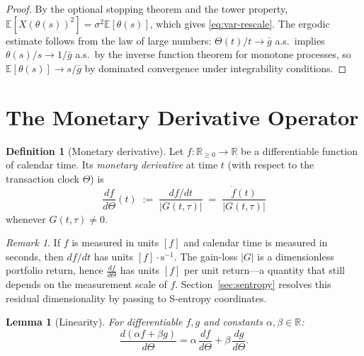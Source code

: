 \documentclass[twocolumn,11pt,a4paper]{article}
\theoremstyle{thmstyle}
\newtheorem{lemma}[theorem]{Lemma}
\theoremstyle{definition}
\newtheorem{definition}[theorem]{Definition}
\theoremstyle{remark}
\newtheorem{remark}[theorem]{Remark}
\newcommand{\Gain}{G}                        %
\newcommand{\Clock}{\Theta}                  %
\newcommand{\InvClock}{\theta}               %
\newcommand{\Mdiff}[1]{\frac{d#1}{d\Clock}} %
\newcommand{\Real}{\mathbb{R}}
\newcommand{\Expect}{\mathbb{E}}
\begin{document}
\begin{proof}
By the optional stopping theorem and the tower property,
$\Expect[X(\InvClock(s))^{2}]
= \sigma^{2}\Expect[\InvClock(s)]$, which gives
\eqref{eq:var-rescale}.  The ergodic estimate follows
from the law of large numbers:
$\Clock(t)/t\to\bar{g}$ a.s.\ implies
$\InvClock(s)/s\to 1/\bar{g}$ a.s.\ by the inverse
function theorem for monotone processes, so
$\Expect[\InvClock(s)]\to s/\bar{g}$ by dominated
convergence under integrability conditions.
\end{proof}


\section{The Monetary Derivative Operator}
\label{sec:mderiv}

\begin{definition}[Monetary derivative]\label{def:mderiv}
Let $f:\Real_{\geq 0}\to\Real$ be a differentiable function
of calendar time.  Its \emph{monetary derivative} at time
$t$ (with respect to the transaction clock $\Clock$) is
\begin{equation}\label{eq:mderiv}
  \Mdiff{f}(t)
  \;:=\; \frac{df/dt}{|\Gain(t,\tau)|}
  \;=\; \frac{\dot{f}(t)}{|\Gain(t,\tau)|}
\end{equation}
whenever $\Gain(t,\tau)\neq 0$.
\end{definition}

\begin{remark}\label{rem:mderiv-units}
If $f$ is measured in units $[f]$ and calendar time is
measured in seconds, then $df/dt$ has units $[f]\cdot
\mathrm{s}^{-1}$.  The gain-loss $|\Gain|$ is a
dimensionless portfolio return, hence
$\Mdiff{f}$ has units $[f]$ per unit return---a quantity
that still depends on the measurement scale of $f$.
Section~\ref{sec:sentropy} resolves this residual
dimensionality by passing to S-entropy coordinates.
\end{remark}

\begin{lemma}[Linearity]\label{lem:linearity}
For differentiable $f,g$ and constants $\alpha,\beta\in\Real$:
\begin{equation}
  \Mdiff{(\alpha f+\beta g)}
  = \alpha\,\Mdiff{f} + \beta\,\Mdiff{g}.
\end{equation}
\end{lemma}
\end{document}
